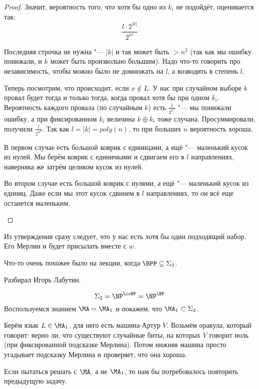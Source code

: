 \begin{proof}
		Значит, вероятность того, что хотя бы одно из $k_i$ не подойдёт, оценивается так:
		\[ \frac{l \cdot 2^{|k|}}{2^{n^2}} \]
		\begin{Rem}
			Последняя строчка не нужна "--- $|k|$ и так может быть $>n^2$ (так как мы ошибку понижали,
			и $k$ может быть произвольно большим).
			Надо что-то говорить про независимость, чтобы можно было не домножать на $l$, а возводить в степень $l$.
		\end{Rem}

		Теперь посмотрим, что происходит, если $x \notin L$.
		У нас при случайном выборе $k$ провал будет тогда и только тогда, когда
		провал хотя бы при одном $k_i$.
		Вероятность каждого провала (по случайным $k$) есть $\frac{1}{2^{n^2}}$ "--- мы понижали ошибку,
		а при фиксированном $k_i$ величина $k \oplus k_i$ тоже случана.
		Просуммировали, получили $\frac{l}{2^{n^2}}$.
		Так как $l=|k|=poly(n)$, то при больших $n$ вероятность хороша.

		\begin{Rem}
			В первом случае есть большой коврик с единицами, а ещё "--- маленький кусок из нулей.
			Мы берём коврик с единичками и сдвигаем его в $l$ направлениях, наверняка же затрём целиком кусок из нулей.

			Во втором случае есть большой коврик с нулями, а ещё "--- маленький кусок из единиц.
			Даже если мы этот кусок сдвинем в $l$ направлениях, то он всё еще останется маленьким.
		\end{Rem}
	\end{proof}
	Из утверждения сразу следует, что у нас есть хотя бы один подходящий набор.
	Его Мерлин и будет присылать вместе с $w$.

	\begin{Rem}
		Что-то очень похожее было на лекции, когда $\BPP \subseteq \Sigma_2$.
	\end{Rem}

	Разбирал Игорь Лабутин.

	\[ \Sigma_2 = \NP^{\coNP} = \NP^{\NP} \]
	Воспользуемся знанием $\MA=\MA_1$ и покажем, что $\MA_1 \subset \Sigma_2$.

	Берём язык $L \in \MA_1$, для него есть машина-Артур $V$.
	Возьмём оракула, который говорит: верно ли, что существуют случайные биты, на которых $V$ говорит ноль
	(при фиксированной подсказке Мерлина).
	Потом нижняя машина просто угадывает подсказку Мерлина и проверяет, что она хороша.
	\begin{Rem}
		Если пытаться решать с $\MA$, а не $\MA_1$, то нам бы потребовалось повторить предыдущую задачу.
	\end{Rem}

